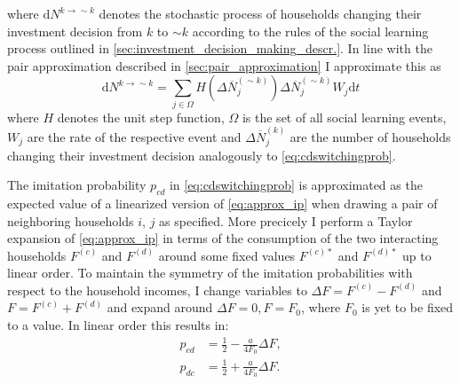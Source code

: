 where $\mathrm{ d} N^{k \rightarrow \sim k}$ denotes the stochastic process of households changing their investment decision from $k$ to $\sim k$ according to the rules of the social learning process outlined in \cref{sec:investment_decision_making_descr.}. In line with the pair approximation described in \cref{sec:pair_approximation} I approximate this as
\begin{equation}
    \mathrm{ d} N^{k \rightarrow \sim k} = \sum_{j \in \Omega} H\left(\Delta \overbar{N}_j^{(\sim k)}\right) \Delta \overbar{N}_j^{(\sim k)}W_j \mathrm{ d}t
\end{equation}
where $H$ denotes the unit step function, $\Omega$ is the set of all social learning events, $W_j$ are the rate of the respective event and $\Delta \overbar{N}_j^{(k)}$ are the number of households changing their investment decision analogously to \cref{eq:cdswitchingprob}. 

The imitation probability $p_{cd}$ in \cref{eq:cdswitchingprob} is approximated as the expected value of a linearized version of \cref{eq:approx_ip} when drawing a pair of neighboring households $i$, $j$ as specified. More precicely I perform a Taylor expansion of \cref{eq:approx_ip} in terms of the consumption of the two interacting households $F^{(c)}$ and $F^{(d)}$ around some fixed values $F^{(c)*}$ and $F^{(d)*}$ up to linear order. To maintain the symmetry of the imitation probabilities with respect to the household incomes, I change variables to $\Delta F = F^{(c)} - F^{(d)}$ and $F = F^{(c)} + F^{(d)}$ and expand around $\Delta F = 0, F = F_0$, where $F_0$ is yet to be fixed to a value. In linear order this results in:
\begin{align}
	p_{cd} &= \frac{1}{2} - \frac{a}{4 F_0} \Delta F, \label{eq:approx_p_cd}\\
	p_{dc} &= \frac{1}{2} + \frac{a}{4 F_0} \Delta F. \label{eq:approx_p_dc}
\end{align}

